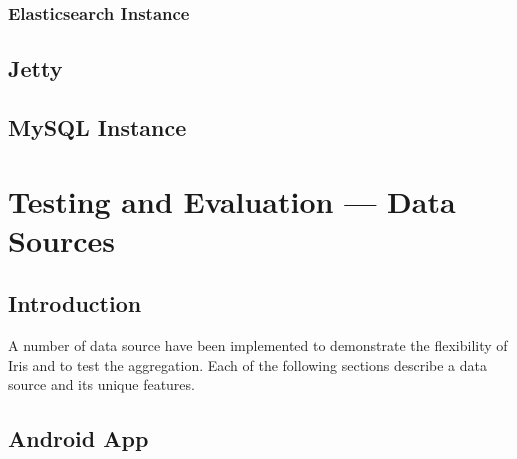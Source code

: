 \documentclass[12pt,a4paper,titlepage]{report}
\begin{document}
\subsubsection{Elasticsearch Instance}

\subsection{Jetty}

\subsection{MySQL Instance}

\section{Testing and Evaluation --- Data Sources}
\label{s:implementation:datasource}
\subsection{Introduction}
A number of data source have been implemented to demonstrate the flexibility of Iris and to test the aggregation. Each
of the following sections describe a data source and its unique features.

\subsection{Android App}
\end{document}
